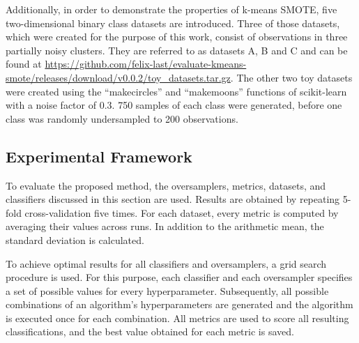 \documentclass[sort&compress]{elsarticle}
\begin{document}
	Additionally, in order to demonstrate the properties of k-means \ac{SMOTE}, five two-dimensional binary class datasets are introduced. Three of those datasets, which were created for the purpose of this work, consist of observations in three partially noisy clusters. They are referred to as datasets A, B and C and can be found at \url{https://github.com/felix-last/evaluate-kmeans-smote/releases/download/v0.0.2/toy_datasets.tar.gz}. The other two toy datasets were created using the ``make\textunderscore circles'' and ``make\textunderscore moons'' functions of scikit-learn with a noise factor of $0.3$. 750 samples of each class were generated, before one class was randomly undersampled to 200 observations.

	\subsection{Experimental Framework}
	\label{sec:experimental-framework}
	To evaluate the proposed method, the oversamplers, metrics, datasets, and classifiers discussed in this section are used. Results are obtained by repeating 5-fold cross-validation five times. For each dataset, every metric is computed by averaging their values across runs. In addition to the arithmetic mean, the standard deviation is calculated.

	To achieve optimal results for all classifiers and oversamplers, a grid search procedure is used. For this purpose, each classifier and each oversampler specifies a set of possible values for every hyperparameter. Subsequently, all possible combinations of an algorithm's hyperparameters are generated and the algorithm is executed once for each combination. All metrics are used to score all resulting classifications, and the best value obtained for each metric is saved.
\end{document}
